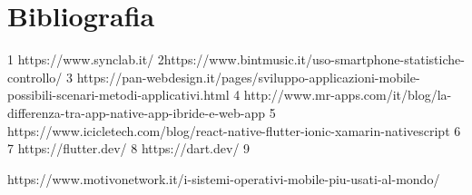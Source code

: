 

\cleardoublepage
\chapter{Bibliografia}

\nocite{*}
\printbibliography[heading=subbibliography,title={Riferimenti bibliografici},type=book]

\printbibliography[heading=subbibliography,title={Siti web consultati},type=online]

1 https://www.synclab.it/
2https://www.bintmusic.it/uso-smartphone-statistiche-controllo/
3 https://pan-webdesign.it/pages/sviluppo-applicazioni-mobile-possibili-scenari-metodi-applicativi.html
4 http://www.mr-apps.com/it/blog/la-differenza-tra-app-native-app-ibride-e-web-app
5
https://www.icicletech.com/blog/react-native-flutter-ionic-xamarin-nativescript
6
7 https://flutter.dev/
8 https://dart.dev/
9


https://www.motivonetwork.it/i-sistemi-operativi-mobile-piu-usati-al-mondo/








